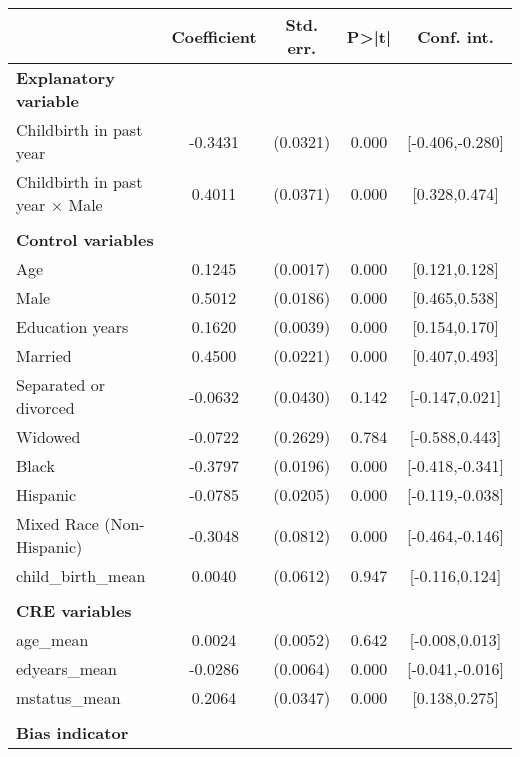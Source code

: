 {
\def\sym#1{\ifmmode^{#1}\else\(^{#1}\)\fi}
\begin{tabular}{l*{1}{cccc}}
\toprule
                    & Coefficient&   Std. err.&       P>|t|&  Conf. int.\\
\midrule
\textbf{Explanatory variable}&            &            &            &            \\
Childbirth in past year&     -0.3431&    (0.0321)&       0.000&[-0.406,-0.280]\\
Childbirth in past year $\times$ Male&      0.4011&    (0.0371)&       0.000&[0.328,0.474]\\
\\ \textbf{Control variables}&            &            &            &            \\
Age                 &      0.1245&    (0.0017)&       0.000&[0.121,0.128]\\
Male                &      0.5012&    (0.0186)&       0.000&[0.465,0.538]\\
Education years     &      0.1620&    (0.0039)&       0.000&[0.154,0.170]\\
Married             &      0.4500&    (0.0221)&       0.000&[0.407,0.493]\\
Separated or divorced&     -0.0632&    (0.0430)&       0.142&[-0.147,0.021]\\
Widowed             &     -0.0722&    (0.2629)&       0.784&[-0.588,0.443]\\
Black               &     -0.3797&    (0.0196)&       0.000&[-0.418,-0.341]\\
Hispanic            &     -0.0785&    (0.0205)&       0.000&[-0.119,-0.038]\\
Mixed Race (Non-Hispanic)&     -0.3048&    (0.0812)&       0.000&[-0.464,-0.146]\\
child\_birth\_mean    &      0.0040&    (0.0612)&       0.947&[-0.116,0.124]\\
\\ \textbf{CRE variables}&            &            &            &            \\
age\_mean            &      0.0024&    (0.0052)&       0.642&[-0.008,0.013]\\
edyears\_mean        &     -0.0286&    (0.0064)&       0.000&[-0.041,-0.016]\\
mstatus\_mean        &      0.2064&    (0.0347)&       0.000&[0.138,0.275]\\
\\ \textbf{Bias indicator}&            &            &            &            \\

\end{tabular}}
